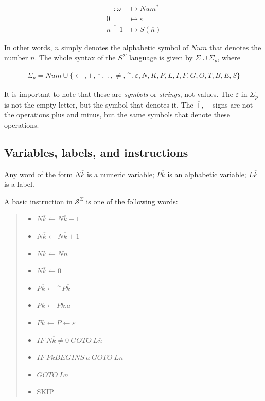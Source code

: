 \documentclass[a4paper, 12pt]{article}
\begin{document}
\begin{align*}
    \text{---} : \omega &\mapsto  Num^{*}  \\ 
    \overline{0} & \mapsto \varepsilon \\ 
    \overline{n + 1} &\mapsto S(\overline{n})
\end{align*}

In other words, $\overline{n}$ simply denotes the alphabetic symbol of $Num$
that denotes the number $n$. The whole syntax of the $S^{\Sigma}$ language is
given by $\Sigma \cup \Sigma_p$, where

\begin{align*}
    \Sigma_p = Num \cup \{ \leftarrow, +, \overline{-}, ~ . ~, \neq, {}^{\curvearrowright},
    \varepsilon, N, K, P, L, I, F, G, O, T, B, E, S \}
\end{align*}

It is important to note that these are \textit{symbols} or \textit{strings}, not
values. The $\varepsilon$ in $\Sigma_p$ is not the empty letter, but the symbol
that denotes it. The $\overline{+}, -$ signs are not the operations plus and
minus, but the same symbols that denote these operations. 

\subsection{Variables, labels, and instructions}

Any word of the form $N \overline{k}$ is a numeric variable; $P \overline{k}$ is
an alphabetic variable; $L \overline{k}$ is a label.

A basic instruction in $\mathcal{S}^{\Sigma}$ is one of the following words: 


\small
\begin{quote}

\begin{itemize}
    \item $N\overline{k} \leftarrow N \overline{k} - 1$
    \item $N\overline{k} \leftarrow N \overline{k} + 1$
    \item $N\overline{k} \leftarrow N \overline{n}$
    \item $N\overline{k} \leftarrow 0$
    \item $P\overline{k} \leftarrow {}^{\curvearrowright}P \overline{k}$
    \item $P\overline{k} \leftarrow P \overline{k}.a$
    \item $P\overline{k} \leftarrow P \leftarrow \varepsilon $
    \item $IF ~ N \overline{k} \neq 0 ~ GOTO ~ L \overline{n}$
    \item $IF ~ P \overline{k} BEGINS ~ a ~ GOTO ~ L \overline{n}$ 
    \item $GOTO ~ L \overline{n}$ 
    \item SKIP
\end{itemize}

\end{quote}
\normalsize
\end{document}
